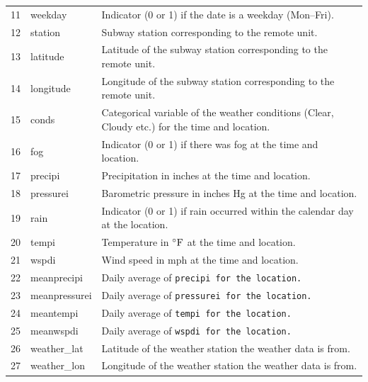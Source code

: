 \documentclass{article}
\begin{document}
\begin{longtable}[h]{c|l|p{8cm}}
11 & weekday & Indicator (0 or 1) if the date is a weekday (Mon--Fri). \\[3pt]

12 & station & Subway station corresponding to the remote unit. \\[3pt]

13 & latitude & Latitude of the subway station corresponding to the remote unit.  \\[3pt]

14 & longitude & Longitude of the subway station corresponding to the remote unit. \\[3pt]

15 & conds & Categorical variable of the weather conditions (Clear, Cloudy etc.) for the time and location. \\[3pt]

16 & fog & Indicator (0 or 1) if there was fog at the time and location. \\[3pt]

17 & precipi & Precipitation in inches at the time and location. \\[3pt]

18 & pressurei & Barometric pressure in inches Hg at the time and location. \\[3pt] 

19 & rain  & Indicator (0 or 1) if rain occurred within the calendar day at the location. \\[3pt]

20 & tempi & Temperature in $^{\circ}{\rm F}$ at the time and location. \\[3pt]

21 & wspdi & Wind speed  in mph at the time and location. \\[3pt]

22 & meanprecipi & Daily average of \tt precipi \rm for the location. \\[3pt]

23 & meanpressurei & Daily average of \tt pressurei \rm for the location. \\[3pt]

24 & meantempi & Daily average of \tt tempi \rm for the location. \\[3pt]

25 & meanwspdi & Daily average of \tt wspdi \rm for the location. \\[3pt]

26 & weather\_lat & Latitude of the weather station the weather data is from. \\[3pt]

27 & weather\_lon & Longitude of the weather station the weather data is from. 
 
\end{longtable}
\end{document}
